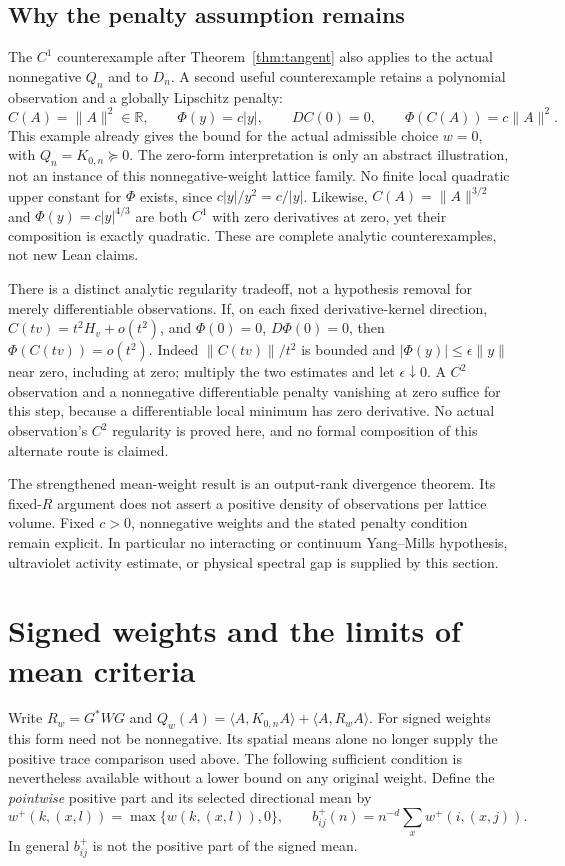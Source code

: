 \documentclass[11pt]{article}
\newcommand{\R}{\mathbb R}
\newcommand{\ip}[2]{\langle #1,#2\rangle}
\begin{document}
\subsection{Why the penalty assumption remains}
The $C^1$ counterexample after Theorem~\ref{thm:tangent} also applies to
the actual nonnegative $Q_n$ and to $D_n$. A second useful counterexample
retains a polynomial observation and a globally Lipschitz penalty:
\[
 C(A)=\|A\|^2\in\R,\qquad \Phi(y)=c|y|,
 \qquad DC(0)=0,\qquad \Phi(C(A))=c\|A\|^2.
\]
This example already gives the bound for the actual admissible choice $w=0$,
with $Q_n=K_{0,n}\succeq0$. The zero-form interpretation is only an abstract
illustration, not an instance of this nonnegative-weight lattice family.
No finite local
quadratic upper constant for $\Phi$ exists, since $c|y|/y^2=c/|y|$.
Likewise, $C(A)=\|A\|^{3/2}$ and $\Phi(y)=c|y|^{4/3}$ are both $C^1$
with zero derivatives at zero, yet their composition is exactly quadratic.
These are complete analytic counterexamples, not new Lean claims.

There is a distinct analytic regularity tradeoff, not a hypothesis removal
for merely differentiable observations. If, on each fixed derivative-kernel
direction, $C(tv)=t^2H_v+o(t^2)$, and $\Phi(0)=0$, $D\Phi(0)=0$, then
$\Phi(C(tv))=o(t^2)$. Indeed $\|C(tv)\|/t^2$ is bounded and
$|\Phi(y)|\leq\epsilon\|y\|$ near zero, including at zero; multiply the
two estimates and let $\epsilon\downarrow0$. A $C^2$ observation and a
nonnegative differentiable penalty vanishing at zero suffice for this
step, because a differentiable local minimum has zero derivative.
No actual observation's $C^2$ regularity is proved here, and no formal
composition of this alternate route is claimed.

The strengthened mean-weight result is an output-rank divergence theorem.
Its fixed-$R$ argument does not assert a positive density of observations
per lattice volume. Fixed $c>0$, nonnegative weights and the stated
penalty condition remain explicit. In particular no interacting or
continuum Yang--Mills hypothesis, ultraviolet activity estimate, or
physical spectral gap is supplied by this section.

\section{Signed weights and the limits of mean criteria}\label{sec:signed}
Write $R_w=G^*W G$ and $Q_w(A)=\ip{A}{K_{0,n}A}+\ip{A}{R_wA}$.
For signed weights this form need not be nonnegative. Its spatial means
alone no longer supply the positive trace comparison used above.
The following sufficient condition is nevertheless available without a
lower bound on any original weight. Define the \emph{pointwise} positive part
and its selected directional mean by
\[
 w^+(k,(x,l))=\max\{w(k,(x,l)),0\},\qquad
 b^+_{ij}(n)=n^{-d}\sum_x w^+(i,(x,j)).
\]
In general $b^+_{ij}$ is not the positive part of the signed mean.
\end{document}
